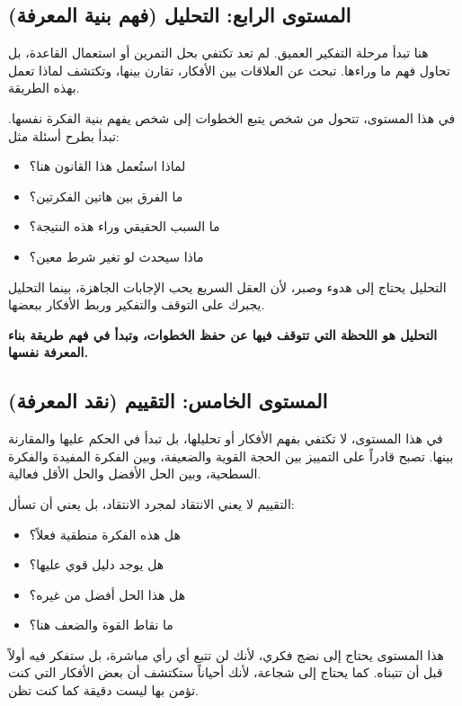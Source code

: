 \documentclass[12pt,a4paper]{book}
\newcommand{\importantAr}[1]{%
	\begin{important}
		\bfseries #1
	\end{important}
}
\begin{document}
	\subsection{المستوى الرابع: التحليل (فهم بنية المعرفة)}
	
	هنا تبدأ مرحلة التفكير العميق. لم تعد تكتفي بحل التمرين أو استعمال القاعدة، بل تحاول فهم ما وراءها. تبحث عن العلاقات بين الأفكار، تقارن بينها، وتكتشف لماذا تعمل بهذه الطريقة.
	
	في هذا المستوى، تتحول من شخص يتبع الخطوات إلى شخص يفهم بنية الفكرة نفسها. تبدأ بطرح أسئلة مثل:
	\begin{itemize}
		\item لماذا استُعمل هذا القانون هنا؟
		\item ما الفرق بين هاتين الفكرتين؟
		\item ما السبب الحقيقي وراء هذه النتيجة؟
		\item ماذا سيحدث لو تغير شرط معين؟
	\end{itemize}
	
	التحليل يحتاج إلى هدوء وصبر، لأن العقل السريع يحب الإجابات الجاهزة، بينما التحليل يجبرك على التوقف والتفكير وربط الأفكار ببعضها.
	
	\importantAr{
		التحليل هو اللحظة التي تتوقف فيها عن حفظ الخطوات، وتبدأ في فهم طريقة بناء المعرفة نفسها.
	}
	
	\subsection{المستوى الخامس: التقييم (نقد المعرفة)}
	
	في هذا المستوى، لا تكتفي بفهم الأفكار أو تحليلها، بل تبدأ في الحكم عليها والمقارنة بينها. تصبح قادراً على التمييز بين الحجة القوية والضعيفة، وبين الفكرة المفيدة والفكرة السطحية، وبين الحل الأفضل والحل الأقل فعالية.
	
	التقييم لا يعني الانتقاد لمجرد الانتقاد، بل يعني أن تسأل:
	\begin{itemize}
		\item هل هذه الفكرة منطقية فعلاً؟
		\item هل يوجد دليل قوي عليها؟
		\item هل هذا الحل أفضل من غيره؟
		\item ما نقاط القوة والضعف هنا؟
	\end{itemize}
	
	هذا المستوى يحتاج إلى نضج فكري، لأنك لن تتبع أي رأي مباشرة، بل ستفكر فيه أولاً قبل أن تتبناه. كما يحتاج إلى شجاعة، لأنك أحياناً ستكتشف أن بعض الأفكار التي كنت تؤمن بها ليست دقيقة كما كنت تظن.
	
\end{document}
